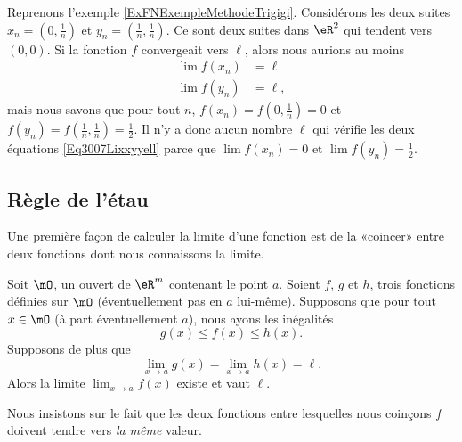 \begin{example} \label{EXooNBTYooFyKRTB}
	Reprenons l'exemple \ref{ExFNExempleMethodeTrigigi}. Considérons les deux suites \( x_n=(0,\frac{1}{ n })\) et \( y_n=(\frac{1}{ n },\frac{1}{ n })\). Ce sont deux suites dans \( \eR^2\) qui tendent vers \( (0,0)\). Si la fonction \( f\) convergeait vers \( \ell\), alors nous aurions au moins
	\begin{subequations}\label{Eq3007Lixxyyell}
		\begin{align}
			\lim f(x_n) & =\ell  \\
			\lim f(y_n) & =\ell,
		\end{align}
	\end{subequations}
	mais nous savons que pour tout \( n\), \( f(x_n)=f(0,\frac{1}{ n })=0\) et \( f(y_n)=f(\frac{1}{ n },\frac{1}{ n })=\frac{1}{ 2 }\). Il n'y a donc aucun nombre \( \ell\) qui vérifie les deux équations \eqref{Eq3007Lixxyyell} parce que \( \lim f(x_n)=0\) et \( \lim f(y_n)=\frac{ 1 }{2}\).
\end{example}

\subsection{Règle de l'étau}

Une première façon de calculer la limite d'une fonction est de la «coincer» entre deux fonctions dont nous connaissons la limite.
\begin{theorem}		\label{ThoRegleEtau}
	Soit \( \mO\), un ouvert de \( \eR^m\) contenant le point \( a\). Soient \( f\), \( g\) et \( h\), trois fonctions définies sur \( \mO\) (éventuellement pas en \( a\) lui-même). Supposons que pour tout \( x\in\mO\) (à part éventuellement \( a\)), nous ayons les inégalités
	\begin{equation}
		g(x)\leq f(x)\leq h(x).
	\end{equation}
	Supposons de plus que
	\begin{equation}
		\lim_{x\to a} g(x)=\lim_{x\to a} h(x)=\ell.
	\end{equation}
	Alors la limite \( \lim_{x\to a} f(x)\) existe et vaut \( \ell\).
\end{theorem}

Nous insistons sur le fait que les deux fonctions entre lesquelles nous coinçons \( f\) doivent tendre vers \emph{la même} valeur.

